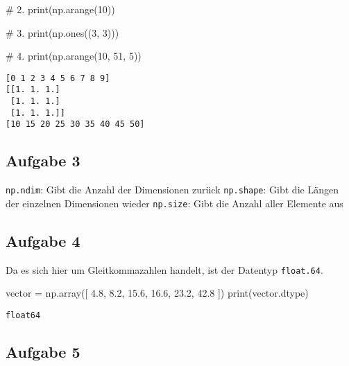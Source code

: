 \documentclass[
  letterpaper,
  DIV=11,
  numbers=noendperiod]{scrreprt}
\newenvironment{Shaded}{\begin{snugshade}}{\end{snugshade}}
\newcommand{\BuiltInTok}[1]{\textcolor[rgb]{0.00,0.23,0.31}{#1}}
\newcommand{\CommentTok}[1]{\textcolor[rgb]{0.37,0.37,0.37}{#1}}
\newcommand{\DecValTok}[1]{\textcolor[rgb]{0.68,0.00,0.00}{#1}}
\newcommand{\FloatTok}[1]{\textcolor[rgb]{0.68,0.00,0.00}{#1}}
\newcommand{\NormalTok}[1]{\textcolor[rgb]{0.00,0.23,0.31}{#1}}
\newcommand{\OperatorTok}[1]{\textcolor[rgb]{0.37,0.37,0.37}{#1}}
\begin{document}
\begin{tcolorbox}
\begin{tcolorbox}
\begin{Shaded}
\begin{Highlighting}[]
\CommentTok{\# 2. }
\BuiltInTok{print}\NormalTok{(np.arange(}\DecValTok{10}\NormalTok{))}

\CommentTok{\# 3. }
\BuiltInTok{print}\NormalTok{(np.ones((}\DecValTok{3}\NormalTok{, }\DecValTok{3}\NormalTok{)))}

\CommentTok{\# 4. }
\BuiltInTok{print}\NormalTok{(np.arange(}\DecValTok{10}\NormalTok{, }\DecValTok{51}\NormalTok{, }\DecValTok{5}\NormalTok{))}
\end{Highlighting}
\end{Shaded}

\begin{verbatim}
[0 1 2 3 4 5 6 7 8 9]
[[1. 1. 1.]
 [1. 1. 1.]
 [1. 1. 1.]]
[10 15 20 25 30 35 40 45 50]
\end{verbatim}

\subsection*{Aufgabe 3}\label{aufgabe-3-1}

\texttt{np.ndim}: Gibt die Anzahl der Dimensionen zurück
\texttt{np.shape}: Gibt die Längen der einzelnen Dimensionen wieder
\texttt{np.size}: Gibt die Anzahl aller Elemente aus

\subsection*{Aufgabe 4}\label{aufgabe-4-1}

Da es sich hier um Gleitkommazahlen handelt, ist der Datentyp
\texttt{float.64}.

\begin{Shaded}
\begin{Highlighting}[]
\NormalTok{vector }\OperatorTok{=}\NormalTok{ np.array([ }\FloatTok{4.8}\NormalTok{,  }\FloatTok{8.2}\NormalTok{, }\FloatTok{15.6}\NormalTok{, }\FloatTok{16.6}\NormalTok{, }\FloatTok{23.2}\NormalTok{, }\FloatTok{42.8}\NormalTok{ ])}
\BuiltInTok{print}\NormalTok{(vector.dtype)}
\end{Highlighting}
\end{Shaded}

\begin{verbatim}
float64
\end{verbatim}

\subsection*{Aufgabe 5}\label{aufgabe-5-1}


\end{tcolorbox}
\end{tcolorbox}
\end{document}
